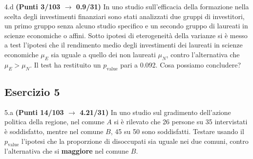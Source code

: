 \documentclass[
  11pt,
]{book}
\theoremstyle{mytheoremstyle}
\theoremstyle{mydefstyle}
\begin{document}
4.d \textbf{(Punti 3/103 \(\rightarrow\) 0.9/31)} In uno studio sull'efficacia della formazione nella scelta degli investimenti finanziari sono stati analizzati due gruppi di investitori, un primo gruppo senza alcuno studio specifico e un secondo gruppo di laureati in scienze economiche o affini. Sotto ipotesi di eterogeneità della varianze si è messo a test l'ipotesi che il rendimento medio degli investimenti dei laureati in scienze economiche \(\mu_E\) sia uguale a quello dei non laureati \(\mu_N\), contro l'alternativa che \(\mu_E>\mu_N\). Il test ha restituito un \(p_\text{value}\) pari a 0.092. Cosa possiamo concludere?

\subsection{Esercizio 5}\label{esercizio-5-18}

5.a \textbf{(Punti 14/103 \(\rightarrow\) 4.21/31)} In uno studio sul gradimento dell'azione politica della regione, nel comune \(A\) si è rilevato che 26 persone su 35 intervistati è soddisfatto, mentre nel comune \(B\), 45 su 50 sono soddisfatti.
Testare usando il \(p_\text{value}\) l'ipotesi che la proporzione di disoccupati sia uguale nei due comuni, contro l'alternativa che si \textbf{maggiore} nel comune \(B\).
\end{document}
